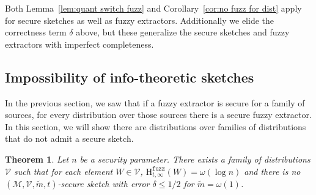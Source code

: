 \documentclass[11pt]{article}
\newcommand{\corref}[1]{\mbox{Corollary~\ref{#1}}}
\newcommand{\lemref}[1]{\mbox{Lemma~\ref{#1}}}
\newcommand{\Hfuzz}{\mathrm{H}^{\mathtt{fuzz}}_{t,\infty}}
\newtheorem{theorem}{Theorem}[section]
\begin{document}

Both \lemref{lem:quant switch fuzz} and \corref{cor:no fuzz for dist} apply for secure sketches as well as fuzzy extractors.  Additionally we elide the correctness term $\delta$ above, but these generalize the secure sketches and fuzzy extractors with imperfect completeness.

\subsection{Impossibility of info-theoretic sketches}
In the previous section, we saw that if a fuzzy extractor is secure for a family of sources, for every distribution over those sources there is a secure fuzzy extractor.  In this section, we will show there are distributions over families of distributions that do not admit a secure sketch.  

\begin{theorem}
Let $n$ be a security parameter.  There exists a family of distributions $\mathcal{V}$ such that for each element $W\in \mathcal{V}$, $\Hfuzz(W)= \omega(\log n)$ and there is no $(\mathcal{M}, \mathcal{V}, \tilde{m}, t)$-secure sketch with error $\delta \le 1/2$ for $\tilde{m} =\omega(1)$.  %
\end{theorem}
\end{document}

